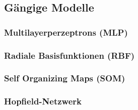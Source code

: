 

\subsection{Gängige Modelle}

\subsubsection{Multilayerperzeptrons (MLP)}

\subsubsection{Radiale Basisfunktionen (RBF)}

\subsubsection{Self Organizing Maps (SOM)}

\subsubsection{Hopfield-Netzwerk}






